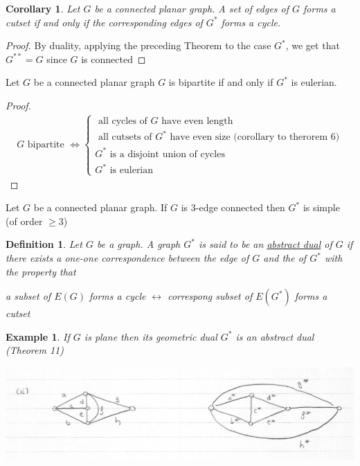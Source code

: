 \documentclass[12pt]{article}
\newenvironment{theorem}[1]{%
  \renewcommand\themanualtheoreminner{#1}%
  \manualtheoreminner
}{\endmanualtheoreminner}
\newtheorem*{corollary}{Corollary}
\newtheorem{example}{Example}
\newtheorem{definition}{Definition}
\begin{document}
\begin{corollary}
	Let $G$ be a connected planar graph. A set of edges of $G$ forms a cutset if and only if the corresponding edges of $G^{*}$ forms a cycle.
\end{corollary}

\begin{proof}
	By duality, applying the preceding Theorem to the case $G^{*}$, we get that $G^{**}=G$ since $G$ is connected
\end{proof}

\begin{theorem}{12}
	Let $G$ be a connected planar graph $G$ is bipartite if and only if $G^{*}$ is eulerian.
\end{theorem}


\begin{proof}

	\begin{align}
		G \text{ bipartite } \Leftrightarrow
		\begin{cases}
			\text{ all cycles of } G \text{ have even length }                             \\
			\text{ all cutsets of } G^{*} \text{ have even size (corollary to therorem 6)} \\
			G^{*} \text{ is a disjoint union of cycles}                                    \\
			G^{*} \text{ is eulerian}
		\end{cases}
	\end{align}

\end{proof}

\begin{theorem}{13}
	Let $G$ be a connected planar graph. If $G$ is 3-edge connected then $G^{*}$ is simple (of order $\ge 3$)
\end{theorem}

\begin{definition}
	Let $G$ be a graph. A graph $G^{*}$ is said to be an \underline{abstract dual} of $G$ if there exists a one-one correspondence between the edge of $G$ and the of $G^{*}$ with the property that

	a subset of $E(G)$ forms a cycle $\leftrightarrow$ correspong subset of $E(G^{*})$ forms a cutset
\end{definition}

\begin{example}
	If $G$ is plane then its geometric dual $G^{*}$ is an abstract dual (Theorem 11)
	\begin{center}
		\includegraphics[scale=0.5]{dual2}
	\end{center}

\end{example}
\end{document}
